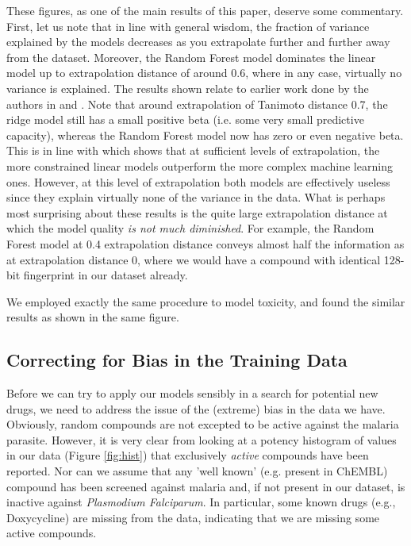 \documentclass[journal=jacsat,manuscript=article]{achemso}
\begin{document}
These figures, as one of the main results of this paper, deserve some commentary. First, let us note that in line with general wisdom, the fraction of variance explained by the models decreases as you extrapolate further and further away from the dataset.  Moreover, the Random Forest model dominates the linear model up to extrapolation distance of around 0.6, where in any case, virtually no variance is explained.
\newline
\newline
The results shown relate to earlier work done by the authors in \citep{et0:} and \citep{et1:}.  Note that around extrapolation of Tanimoto distance 0.7, the ridge model still has a small positive beta (i.e. some very small predictive capacity), whereas the Random Forest model now has zero or even negative beta.  This is in line with \citep{et1:} which shows that at sufficient levels of extrapolation, the more constrained linear models outperform the more complex machine learning ones.  However, at this level of extrapolation both models are effectively useless since they explain virtually none of the variance in the data.  
\newline
\newline
What is perhaps most surprising about these results is the quite large extrapolation distance at which the model quality \textit{is not much diminished}.  For example, the Random Forest model at 0.4 extrapolation distance conveys almost half the information as at extrapolation distance 0, where we would have a compound with identical 128-bit fingerprint in our dataset already.

We  employed exactly the same procedure to model toxicity, and found the similar results as shown in the same figure.


\subsection*{Correcting for Bias in the Training Data}

Before we can try to apply our models sensibly in a search for potential new drugs, we need to address the issue of the (extreme) bias in the data we have.  Obviously, random compounds are not excepted to be active against the malaria parasite.  However, it is very clear from looking at a potency histogram of values in our data (Figure \ref{fig:hist}) that %
exclusively \textit{active} compounds have been reported.  Nor can we assume that any 'well known' (e.g. present in ChEMBL) compound has been screened against malaria and, if not present in our dataset, is inactive against \textit{Plasmodium Falciparum}.  In particular, some known drugs (e.g., Doxycycline) are missing from the data, indicating that we are missing some active compounds.
\end{document}
